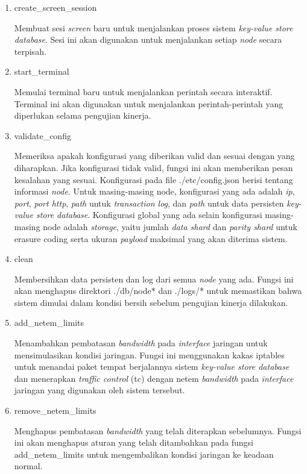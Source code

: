 \begin{enumerate}
	\item create\_screen\_session

	      Membuat sesi \textit{screen} baru untuk menjalankan proses sistem \textit{key-value store database}. Sesi ini akan digunakan untuk menjalankan setiap \textit{node} secara terpisah.

	\item start\_terminal

	      Memulai terminal baru untuk menjalankan perintah secara interaktif. Terminal ini akan digunakan untuk menjalankan perintah-perintah yang diperlukan selama pengujian kinerja.

	\item validate\_config

	      Memeriksa apakah konfigurasi yang diberikan valid dan sesuai dengan yang diharapkan. Jika konfigurasi tidak valid, fungsi ini akan memberikan pesan kesalahan yang sesuai. Konfigurasi pada file ./etc/config.json berisi tentang informasi \textit{node}. Untuk masing-masing node, konfigurasi yang ada adalah \textit{ip}, \textit{port}, \textit{port http}, \textit{path} untuk \textit{transaction log}, dan \textit{path} untuk data persisten \textit{key-value store database}. Konfigurasi global yang ada selain konfigurasi masing-masing node adalah \textit{storage}, yaitu jumlah \textit{data shard} dan \textit{parity shard} untuk erasure coding serta ukuran \textit{payload} maksimal yang akan diterima sistem.

	\item clean

	      Membersihkan data persisten dan log dari semua \textit{node} yang ada. Fungsi ini akan menghapus direktori ./db/node* dan ./logs/* untuk memastikan bahwa sistem dimulai dalam kondisi bersih sebelum pengujian kinerja dilakukan.

	\item add\_netem\_limits

	      Menambahkan pembatasan \textit{bandwidth} pada \textit{interface} jaringan untuk mensimulasikan kondisi jaringan. Fungsi ini menggunakan kakas iptables untuk menandai paket tempat berjalannya sistem \textit{key-value store database} dan menerapkan \textit{traffic control} (tc) dengan netem \textit{bandwidth} pada \textit{interface} jaringan yang digunakan oleh sistem tersebut.

	\item remove\_netem\_limits

	      Menghapus pembatasan \textit{bandwidth} yang telah diterapkan sebelumnya. Fungsi ini akan menghapus aturan yang telah ditambahkan pada fungsi add\_netem\_limits untuk mengembalikan kondisi jaringan ke keadaan normal.

\end{enumerate}

